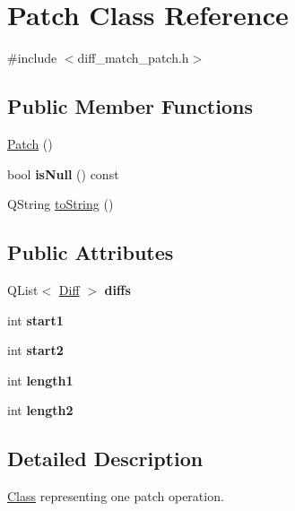 \hypertarget{class_patch}{}\section{Patch Class Reference}
\label{class_patch}


{\ttfamily \#include $<$diff\+\_\+match\+\_\+patch.\+h$>$}

\subsection*{Public Member Functions}
\begin{DoxyCompactItemize}
\item 
\hyperlink{class_patch_a65fdd4bb128b8f50c1b9dcc008f20360}{Patch} ()
\item 
\mbox{\label{class_patch_ab52ef63262e00ccdb22174c898289dcc}} 
bool {\bfseries is\+Null} () const
\item 
Q\+String \hyperlink{class_patch_a53799d5296a89879d88f76c8f10602e7}{to\+String} ()
\end{DoxyCompactItemize}
\subsection*{Public Attributes}
\begin{DoxyCompactItemize}
\item 
\mbox{\label{class_patch_a5017c7eb1118cc8ebe7030dd7a86475a}} 
Q\+List$<$ \hyperlink{class_diff}{Diff} $>$ {\bfseries diffs}
\item 
\mbox{\label{class_patch_ae2fbf0aefd6ab5aeec4379cf388ff158}} 
int {\bfseries start1}
\item 
\mbox{\label{class_patch_a1ceab2853be39f706627f98e4d2ad8d6}} 
int {\bfseries start2}
\item 
\mbox{\label{class_patch_a6f1d748d94184a8f492bece1f967777d}} 
int {\bfseries length1}
\item 
\mbox{\label{class_patch_a9ef05324cac27ec93ebd0be4270e9d1e}} 
int {\bfseries length2}
\end{DoxyCompactItemize}


\subsection{Detailed Description}
\hyperlink{struct_class}{Class} representing one patch operation. 

